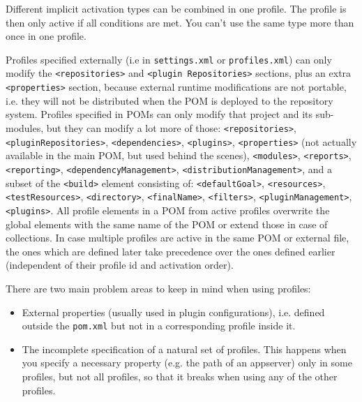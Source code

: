 \documentclass[table, xcdraw]{article}%
\begin{document}
Different implicit activation types can be combined in one profile. The profile is then only active if all conditions are met. You can't use the same type more than once in one profile.

Profiles specified externally (i.e in \texttt{settings.xml} or \texttt{profiles.xml}) can only modify the \texttt{<repositories>} and \texttt{<plugin Repositories>} sections, plus an extra \texttt{<properties>} section, because external runtime modifications are not portable, i.e. they will not be distributed when the POM is deployed to the repository system. Profiles specified in POMs can only modify that project and its sub-modules, but they can modify a lot more of those: \texttt{<repositories>},\texttt{<pluginRepositories>}, \texttt{<dependencies>}, \texttt{<plugins>}, \texttt{<properties>} (not actually available in the main POM, but used behind the scenes), \texttt{<modules>}, \texttt{<reports>}, \texttt{<reporting>}, \texttt{<dependencyManagement>}, \texttt{<distributionManagement>}, and a subset of the \texttt{<build>} element consisting of: \texttt{<defaultGoal>}, \texttt{<resources>}, \texttt{<testResources>}, \texttt{<directory>}, \texttt{<finalName>}, \texttt{<filters>}, \texttt{<pluginManagement>}, \texttt{<plugins>}. All profile elements in a POM from active profiles overwrite the global elements with the same name of the POM or extend those in case of collections. In case multiple profiles are active in the same POM or external file, the ones which are defined later take precedence over the ones defined earlier (independent of their profile id and activation order).

There are two main problem areas to keep in mind when using profiles:

\begin{itemize}
    \item External properties (usually used in plugin configurations), i.e. defined outside the \texttt{pom.xml} but not in a corresponding profile inside it.
    \item The incomplete specification of a natural set of profiles. This happens when you specify a necessary property (e.g. the path of an appserver) only in some profiles, but not all profiles, so that it breaks when using any of the other profiles.
\end{itemize}
\end{document}
